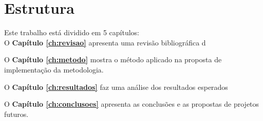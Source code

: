 	\section{Estrutura}
	
		Este trabalho está dividido em 5 capítulos:\\
		
		O \textbf{Capítulo \ref{ch:revisao}} apresenta uma revisão bibliográfica d
		
		O \textbf{Capítulo \ref{ch:metodo}} mostra o método aplicado na proposta de implementação da metodologia.
		
		O \textbf{Capítulo \ref{ch:resultados}} faz uma análise dos resultados esperados 
		
		O \textbf{Capítulo \ref{ch:conclusoes}} apresenta as conclusões e as propostas de projetos futuros.